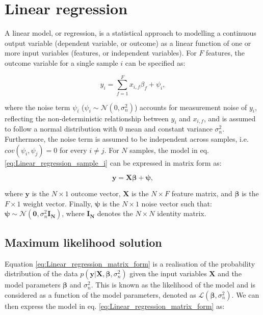
\section{Linear regression} 
\label{sec:linear_regression}

A linear model, or regression, is a statistical approach to modelling a continuous output variable (dependent variable, or outcome) as a linear function of one or more input variables (features, or independent variables). 
For $F$ features, the outcome variable for a single sample $i$ can be specified as:

\begin{equation} \label{eq:Linear_regression_sample_i}
 y_i = \sum_{f=1}^{F} x_{i,f}\beta_f + \psi_i,
\end{equation}

where the noise term $\psi_i$ ($ \psi_i \sim \mathcal{N}(0, \sigma_n^2)$) accounts for measurement noise of $y_i$, reflecting the non-deterministic relationship between $y_i$ and $x_{i,f}$, and is assumed to follow a normal distribution with $0$ mean and constant variance $\sigma_n^2$. 
Furthermore, the noise term is assumed to be independent across samples, i.e. $cov(\psi_i, \psi_j)=0$ for every $i \neq j$. 
For $N$ samples, the model in eq. \eqref{eq:Linear_regression_sample_i} can be expressed in matrix form as:

\begin{equation} \label{eq:Linear_regression_matrix_form}
\mathbf{y} = \mathbf{X}\boldsymbol{\beta} + \boldsymbol{\psi}, 
\end{equation}

where $\mathbf{y}$ is the $N \times 1$ outcome vector, $\mathbf{X}$ is the $N \times F$ feature matrix, and $\boldsymbol{\beta}$ is the $F \times 1$ weight vector. 
Finally, $\boldsymbol{\psi}$ is the $N \times 1$ noise vector such that: $\boldsymbol{\psi}\sim \mathcal{N}(\mathbf{0}, \sigma_n^2 \mathbf{I_N})$, where $\mathbf{I_N}$ denotes the $N \times N$ identity matrix. 


\subsection{Maximum likelihood solution}

Equation \eqref{eq:Linear_regression_matrix_form} is a realisation of the probability distribution of the data $p(\mathbf{y}| \mathbf{X}, \boldsymbol{\beta}, \sigma_n^2)$ given the input variables $\mathbf{X}$ and the model parameters $\boldsymbol{\beta}$ and $\sigma_n^2$.
This is known as the likelihood of the model and is considered as a function of the model parameters, denoted as $\mathcal{L}(\boldsymbol{\beta}, \sigma_n^2)$. 
We can then express the model in eq. \eqref{eq:Linear_regression_matrix_form} as:

